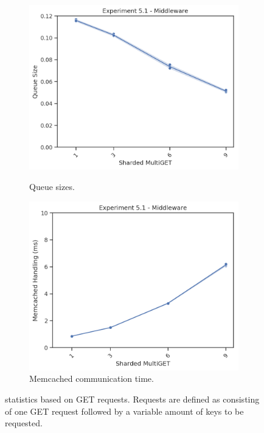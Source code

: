 \begin{figure}
            \begin{subfigure}[t!]{0.48\textwidth}
                \centering
                \includegraphics[width=\textwidth]{../data_analysis/figures/5-1_mw_queue-size.png}
                \caption{Queue sizes.\label{fig:shard_mw_qs}}
                \includegraphics[width=\textwidth]{../data_analysis/figures/5-1_mw_mc-comm-time.png}
                \caption{Memcached communication time.\label{fig:shard_mw_mct}}
            \end{subfigure}
            \caption{\mw{} statistics based on GET requests. Requests are defined as consisting of one GET request
                     followed by a variable amount of keys to be requested.\label{fig:shard_mw}}
        \end{figure}

